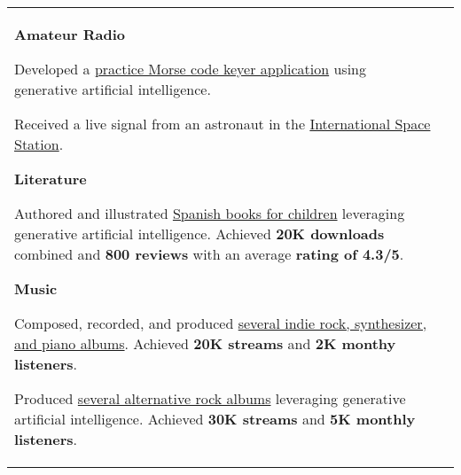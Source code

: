 \documentclass[letterpaper,10pt,oneside]{article}
\newcommand{\itemspacingtwo}{\vspace{0.04cm}}
\newenvironment{body}
{\par\par
\begin{longtable}{p{0.145\textwidth}p{0.81\textwidth}}}
{\par\end{longtable}\par}
\begin{document}
\begin{body}
\textbf{Amateur Radio}
\begin{comp}
\item Developed a \href{https://lquesada.github.io/MorsePractice/}{practice Morse code keyer application} using generative artificial intelligence.
\item Received a live signal from an astronaut in the \href{https://www.youtube.com/watch?v=tkVmO62aYzk}{International Space Station}.
\end{comp}
\itemspacingtwo

\textbf{Literature}
\begin{comp}
\item Authored and illustrated \href{https://www.amazon.es/dp/B0C4DVR9N5}{Spanish books for children} leveraging generative artificial intelligence.
  \newline Achieved \textbf{20K downloads} combined and \textbf{800 reviews} with an average \textbf{rating of 4.3/5}.
\end{comp}
\itemspacingtwo

\textbf{Music}
\begin{comp}
\item Composed, recorded, and produced \href{https://open.spotify.com/artist/3RPEdOJGGdk3kOnmVq3dgX}{several indie rock, synthesizer, and piano albums}.
  \newline Achieved \textbf{20K streams} and \textbf{2K monthy listeners}.
\item Produced \href{https://open.spotify.com/artist/6GdiI8ZKeWhSY73WWOhbep}{several alternative rock albums} leveraging generative artificial intelligence.
  \newline Achieved \textbf{30K streams} and \textbf{5K monthly listeners}.
\end{comp}

\end{body}
\end{document}
